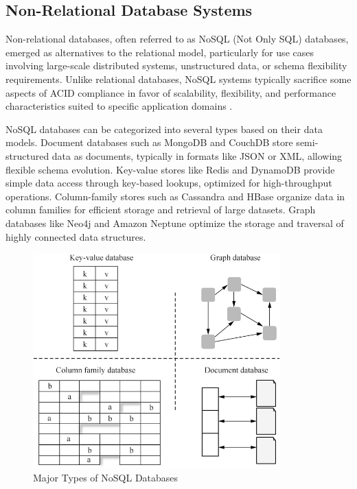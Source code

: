 \subsection{Non-Relational Database Systems}
\label{subsec:non-relational-database-systems}

Non-relational databases, often referred to as NoSQL (Not Only SQL) databases, emerged as alternatives to the relational model, particularly for use cases involving large-scale distributed systems, unstructured data, or schema flexibility requirements. Unlike relational databases, NoSQL systems typically sacrifice some aspects of ACID compliance in favor of scalability, flexibility, and performance characteristics suited to specific application domains \cite{bhattacherjee2015principles}.

NoSQL databases can be categorized into several types based on their data models. Document databases such as MongoDB and CouchDB store semi-structured data as documents, typically in formats like JSON or XML, allowing flexible schema evolution. Key-value stores like Redis and DynamoDB provide simple data access through key-based lookups, optimized for high-throughput operations. Column-family stores such as Cassandra and HBase organize data in column families for efficient storage and retrieval of large datasets. Graph databases like Neo4j and Amazon Neptune optimize the storage and traversal of highly connected data structures.

\begin{figure}[ht]
    \centering
    \includegraphics[width=0.85\textwidth]{figures/nosql_types.png}
    \caption{Major Types of NoSQL Databases \cite{gaussdbdatabase}}
    \label{fig:nosql-types}
\end{figure}

